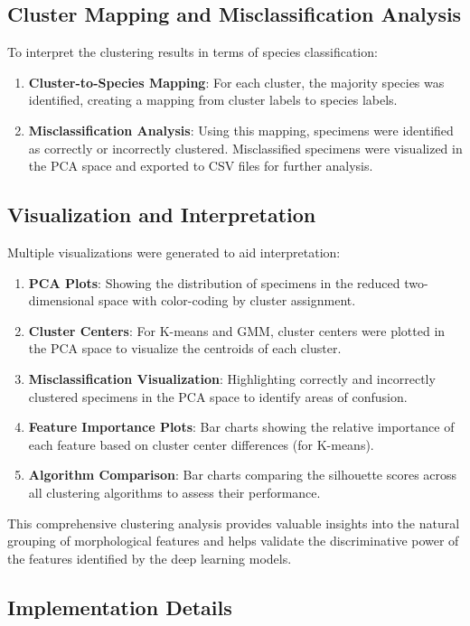 \documentclass[a4paper,12pt]{report}
\begin{document}
\subsection{Cluster Mapping and Misclassification Analysis}
To interpret the clustering results in terms of species classification:
\begin{enumerate}
    \item \textbf{Cluster-to-Species Mapping}: For each cluster, the majority species was identified, creating a mapping from cluster labels to species labels.
    \item \textbf{Misclassification Analysis}: Using this mapping, specimens were identified as correctly or incorrectly clustered. Misclassified specimens were visualized in the PCA space and exported to CSV files for further analysis.
\end{enumerate}

\subsection{Visualization and Interpretation}
Multiple visualizations were generated to aid interpretation:
\begin{enumerate}
    \item \textbf{PCA Plots}: Showing the distribution of specimens in the reduced two-dimensional space with color-coding by cluster assignment.
    \item \textbf{Cluster Centers}: For K-means and GMM, cluster centers were plotted in the PCA space to visualize the centroids of each cluster.
    \item \textbf{Misclassification Visualization}: Highlighting correctly and incorrectly clustered specimens in the PCA space to identify areas of confusion.
    \item \textbf{Feature Importance Plots}: Bar charts showing the relative importance of each feature based on cluster center differences (for K-means).
    \item \textbf{Algorithm Comparison}: Bar charts comparing the silhouette scores across all clustering algorithms to assess their performance.
\end{enumerate}
This comprehensive clustering analysis provides valuable insights into the natural grouping of morphological features and helps validate the discriminative power of the features identified by the deep learning models.

\subsection{Implementation Details}
\end{document}
